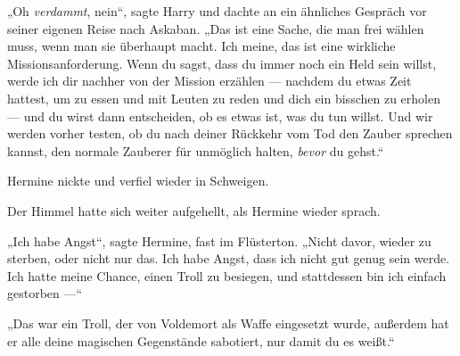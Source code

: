 „Oh \emph{verdammt}, nein“, sagte Harry und dachte an ein ähnliches Gespräch vor seiner eigenen Reise nach Askaban.
„Das ist eine Sache, die man frei wählen muss, wenn man sie überhaupt macht. Ich meine, das ist eine wirkliche Missionsanforderung. Wenn du sagst, dass du immer noch ein Held sein willst, werde ich dir nachher von der Mission erzählen — nachdem du etwas Zeit hattest, um zu essen und mit Leuten zu reden und dich ein bisschen zu erholen — und du wirst dann entscheiden, ob es etwas ist, was du tun willst. Und wir werden vorher testen, ob du nach deiner Rückkehr vom Tod den Zauber sprechen kannst, den normale Zauberer für unmöglich halten, \emph{bevor} du gehst.“

Hermine nickte und verfiel wieder in Schweigen.

Der Himmel hatte sich weiter aufgehellt, als Hermine wieder sprach.

„Ich habe Angst“, sagte Hermine, fast im Flüsterton.
„Nicht davor, wieder zu sterben, oder nicht nur das. Ich habe Angst, dass ich nicht gut genug sein werde. Ich hatte meine Chance, einen Troll zu besiegen, und stattdessen bin ich einfach gestorben —“

„Das war ein Troll, der von Voldemort als Waffe eingesetzt wurde, außerdem hat er alle deine magischen Gegenstände sabotiert, nur damit du es weißt.“

